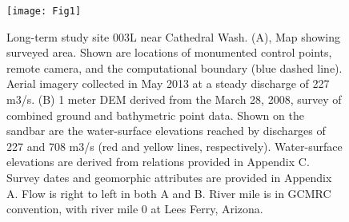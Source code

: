 \graphicspath{{003L/input/}}

\newcommand{\hbAppendixPrefix}{003L---D}



\renewcommand{\thefigure}{\hbAppendixPrefix\arabic{figure}}
\setcounter{figure}{0}
\renewcommand{\thetable}{\hbAppendixPrefix\arabic{table}} 
\setcounter{table}{0}

\begin{figure}[H]
	\centering
	\texttt{[image: Fig1]}
	\caption{Long-term study site 003L near Cathedral Wash.  (A), Map showing surveyed area.  Shown are locations of monumented control points, remote camera, and the computational boundary (blue dashed line).  Aerial imagery collected in May 2013 at a steady discharge of 227 m3/s.  (B) 1 meter DEM derived from the March 28, 2008, survey of combined ground and bathymetric point data.  Shown on the sandbar are the water-surface elevations reached by discharges of 227 and 708 m3/s (red and yellow lines, respectively).  Water-surface elevations are derived from relations provided in Appendix C.  Survey dates and geomorphic attributes are provided in Appendix A.  Flow is right to left in both A and B.  River mile is in GCMRC convention, with river mile 0 at Lees Ferry, Arizona.}
\end{figure}


